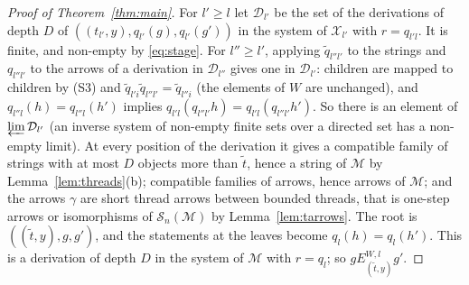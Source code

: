 \documentclass[11pt]{amsart}
\theoremstyle{definition}
\newcommand{\cX}{\mathcal X}
\newcommand{\cM}{\mathcal M}
\newcommand{\cS}{\mathcal S}
\begin{document}
\begin{proof}[Proof of Theorem~\ref{thm:main}]
For $l'\ge l$ let $\mathcal D_{l'}$ be the set of the derivations of
depth $D$ of $((t_{l'},y),q_{l'}(g),q_{l'}(g'))$ in the system of
$\cX_{l'}$ with $r=q_{l'l}$. It is finite, and non-empty by
\eqref{eq:stage}. For $l''\ge l'$, applying $\tilde q_{l''l'}$ to
the strings and $q_{l''l'}$ to the arrows of a derivation in
$\mathcal D_{l''}$ gives one in $\mathcal D_{l'}$: children are
mapped to children by (S3) and $\tilde q_{l'i}\tilde q_{l''l'}=
\tilde q_{l''i}$ (the elements of $W$ are unchanged), and
$q_{l''l}(h)=q_{l''l}(h')$ implies $q_{l'l}(q_{l''l'}h)=q_{l'l}(
q_{l''l'}h')$. So there is an element of $\varprojlim\mathcal
D_{l'}$ (an inverse system of non-empty finite sets over a directed
set has a non-empty limit). At every position of the derivation it gives a compatible
family of strings with at most $D$ objects more than $\tilde t$,
hence a string of $\cM$ by Lemma~\ref{lem:threads}(b); compatible
families of arrows, hence arrows of $\cM$; and the arrows $\gamma$
are short thread arrows between bounded threads, that is one-step
arrows or isomorphisms of $\cS_n(\cM)$ by Lemma~\ref{lem:tarrows}. The root is
$((\tilde t,y),g,g')$, and the statements at the leaves become
$q_l(h)=q_l(h')$. This is a derivation of depth $D$ in the system of
$\cM$ with $r=q_l$; so $g\mathrel{E^{W,l}_{(\tilde t,y)}}g'$.
\end{proof}
\end{document}
